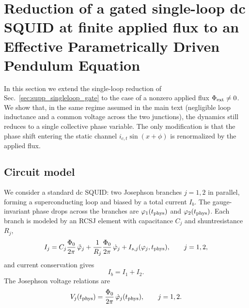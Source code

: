 \documentclass[prl,twocolumn,superscriptaddress,showpacs,nofootinbib]{revtex4-2}
\begin{document}
\section{Reduction of a gated single-loop dc SQUID at finite applied flux to an Effective Parametrically Driven Pendulum Equation}
\label{sec:supp_singleloop_gate_flux}

In this section we extend the single-loop reduction of Sec.~\ref{sec:supp_singleloop_gate} to the case of a nonzero applied flux $\Phi_{\rm ext}\neq 0$. We show that, in the same regime assumed in the main text (negligible loop inductance and a common voltage across the two junctions), the dynamics still reduces to a single collective phase variable. The only modification is that the phase shift entering the static channel
$i_{c,t}\sin(x+\phi)$ is renormalized by the applied flux.

\subsection{Circuit model}

We consider a standard dc SQUID: two Josephson branches $j=1,2$ in parallel, forming a superconducting loop and biased by a total current $I_b$. The gauge-invariant phase drops across the branches are
$\varphi_1(t_{\rm phys})$ and $\varphi_2(t_{\rm phys})$.
Each branch is modeled by an RCSJ element with capacitance $C_j$ and shuntresistance $R_j$,
\begin{equation}
I_j
= C_j\frac{\Phi_0}{2\pi}\,\ddot\varphi_j
+ \frac{1}{R_j}\frac{\Phi_0}{2\pi}\,\dot\varphi_j
+ I_{s,j}(\varphi_j,t_{\rm phys}),
\qquad j=1,2,
\label{eq:RCSJ_each_flux}
\end{equation}
and current conservation gives
\begin{equation}
I_b = I_1+I_2.
\label{eq:Ib_split_flux}
\end{equation}
The Josephson voltage relations are
\begin{equation}
V_j(t_{\rm phys})=\frac{\Phi_0}{2\pi}\,\dot\varphi_j(t_{\rm phys}),
\qquad j=1,2.
\label{eq:JJ_voltage_flux}
\end{equation}
\end{document}
